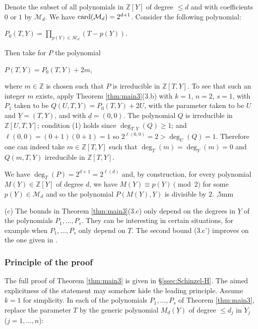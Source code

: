 \documentclass[11pt,a4paper,reqno]{amsart}
\def\Z{\mathbb{Z}}
\theoremstyle{definition}
\begin{document}
Denote the subset of all polynomials in $\Z[Y]$ of degree $\leq d$ and with  coefficients $0$ or $1$ by ${\mathcal M}_d$. We have ${\rm card}({\mathcal M}_d)= 2^{d+1}$. Consider the following polynomial:
\vskip 1mm


\centerline{$\displaystyle P_0(T,Y) = \prod_{p(Y)\in {\mathcal M}_d} (T-p(Y))$.}
\vskip 1mm

\noindent
Then take for $P$ the polynomial  
\vskip 1mm


\centerline{$P(T,Y)= P_0(T,Y) + 2m$,}
\vskip 1mm

\noindent
where $m\in \Z$ is chosen such that $P$ is irreducible in $\Z[T,Y]$. To see that such an integer $m$ exists, apply Theorem \ref{thm:main3}(3.b) with $k=1$, $n=2$, $s=1$, with $P_1$ taken to be $Q(U,T,Y)= P_0(T,Y) +2 U$, with the parameter taken to be $U$ and ${\underline Y}=(T,Y)$, and with $\underline d=(0,0)$. The polynomial $Q$ is irreducible in $\Z[U,T,Y]$; condition (1) holds since $\deg_{T,Y}(Q) \geq 1$; and $\ell(0,0) = (0+1)(0+1)=1$ so $2^{\ell(0,0)}=2 > \deg_U(Q)=1$. Therefore one can indeed take $m\in \Z[T,Y]$ such that $\deg_T(m) = \deg_Y(m)=0$ and $Q(m,T,Y)$ irreducible in $\Z [T,Y]$. 

We have $\deg_T(P) =2^{d +1} = 2^{\ell(d)}$ and, by construction, for every polynomial $M(Y)\in \Z[Y]$ of degree $d$, we have $M(Y) \equiv p(Y) \pmod{2}$ for some $p(Y)\in {\mathcal M}_d$ and so the polynomial $P(M(Y),Y)$ is divisible by $2$. %
%
,5mm


\noindent
(c) 
The bounds in Theorem \ref{thm:main3}(3.c) only depend on the degrees in $\underline Y$ of the polynomials $P_1,\ldots,P_s$. They can be interesting in certain situations, for example when $P_1,\ldots,P_s$ only depend on $\underline T$. The second bound (3.c') improves on the one given in \cite[Theorem 1.1]{BDN20b}.

\subsubsection{Principle of the proof}
The full proof of Theorem \ref{thm:main3} is given in \S \ref{ssec:Schinzel-H}. The aimed explicitness of the statement may somehow hide the leading principle.
Assume $k=1$ for simplicity.
In each of the polynomials $P_1,\ldots,P_s$ of Theorem \ref{thm:main3}, replace the parameter $T$ by the generic polynomial $M_{{\underline d}}(\underline Y)$ of degree $\leq d_{j}$ in $Y_j$ ($j=1,\ldots,n$):
\vskip 1mm
\end{document}
